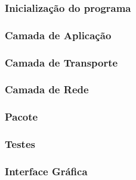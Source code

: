 \documentclass[brazil,times,12pt]{abnt}
\begin{document}
	\subsubsection{Inicialização do programa}
	
	
	\subsubsection{Camada de Aplicação}
	
	
	\subsubsection{Camada de Transporte}
	
	
	\subsubsection{Camada de Rede}
	

	\subsubsection{Pacote}
	

	\subsubsection{Testes}
	

	\subsubsection{Interface Gráfica}
	
	



\end{document}
